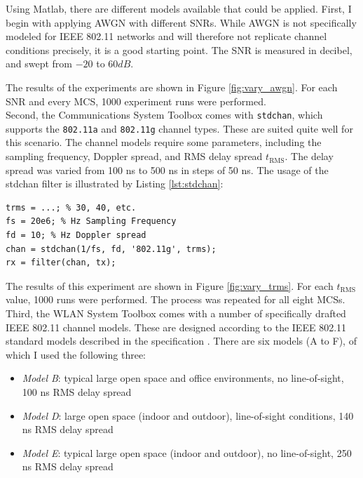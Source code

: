 Using Matlab, there are different models available that could be applied. First, I begin with applying \gls{AWGN} with different \glspl{SNR}. While \gls{AWGN} is not specifically modeled for IEEE 802.11 networks and will therefore not replicate channel conditions precisely, it is a good starting point. The \gls{SNR} is measured in decibel, and swept from $ -20 $ to $ 60 dB $.

The results of the experiments are shown in Figure \ref{fig:vary_awgn}. For each \gls{SNR} and every \gls{MCS}, 1000 experiment runs were performed.\\

Second, the Communications System Toolbox comes with \texttt{stdchan}, which supports the \texttt{802.11a} and \texttt{802.11g} channel types. These are suited quite well for this scenario. The channel models require some parameters, including the sampling frequency, Doppler spread, and \gls{RMS} delay spread $ t_{\text{RMS}} $. The delay spread was varied from 100 ns to 500 ns in steps of 50 ns. The usage of the stdchan filter is illustrated by Listing \ref{lst:stdchan}:

\begin{lstlisting}[captionpos=b,caption={Matlab \emph{stdchan} Channel Model},label=lst:stdchan]
trms = ...; % 30, 40, etc.
fs = 20e6; % Hz Sampling Frequency
fd = 10; % Hz Doppler spread
chan = stdchan(1/fs, fd, '802.11g', trms);
rx = filter(chan, tx);
\end{lstlisting}

The results of this experiment are shown in Figure \ref{fig:vary_trms}. For each $ t_{\text{RMS}} $ value, 1000 runs were performed. The process was repeated for all eight \glspl{MCS}.\\

Third, the WLAN System Toolbox comes with a number of specifically drafted IEEE 802.11 channel models. These are designed according to the IEEE 802.11 standard models described in the specification \cite{ieee2012}. There are six models (A to F), of which I used the following three:

\begin{itemize}
	\item \textit{Model B}: typical large open space and office environments, no line-of-sight, 100 ns \gls{RMS} delay spread
	\item \textit{Model D}: large open space (indoor and outdoor), line-of-sight conditions, 140 ns \gls{RMS} delay spread
	\item \textit{Model E}: typical large open space (indoor and outdoor), no line-of-sight, 250 ns \gls{RMS} delay spread
\end{itemize}

